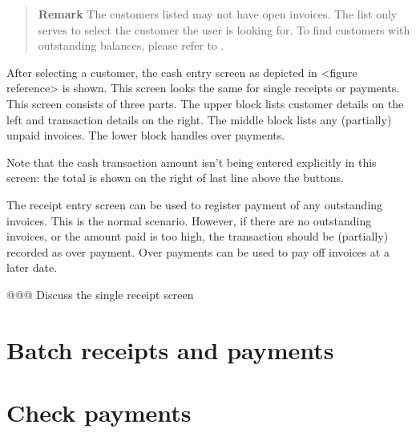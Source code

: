 \begin{quotation}
\textbf{Remark} The customers listed may not have open invoices. The list only serves to select
the \gls{customer} the user is looking for. To find customers with outstanding balances, please refer to
.
\end{quotation}

After selecting a \gls{customer}, the cash entry screen as depicted in <figure reference> is shown. This
screen looks the same for single receipts or payments. This screen consists of three parts. The upper
block lists customer details on the left and transaction details on the right. The middle block lists
any (partially) unpaid invoices. The lower block handles over payments.

Note that the cash transaction amount isn't being entered explicitly in this screen: the total
is shown on the right of last line above the buttons.

The receipt entry screen can be used to register payment of any outstanding invoices. This is the
normal scenario. However, if there are no outstanding invoices, or the amount paid is too high,
the transaction should be (partially) recorded as over payment. Over payments can be used to
pay off invoices at a later date.


@@@ Discuss the single receipt screen



\section{Batch receipts and payments}
\label{sec-business-processes-payment-processing-batch-payments}

\section{Check payments}
\label{sec-business-processes-payment-processing-check-payments}

